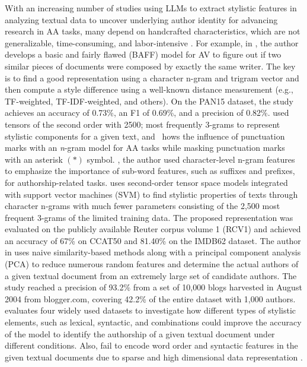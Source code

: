 \documentclass[conference]{IEEEtran}
\begin{document}
With an increasing number of studies using LLMs to extract stylistic features in analyzing textual data to uncover underlying author identity for advancing research in AA tasks, many depend on handcrafted characteristics, which are not generalizable, time-consuming, and labor-intensive \cite{ding2017learning,stamatatos2009survey,vosoughi2016tweet2vec}. For example, in \cite{bevendorff2019bias}, the author develops a basic and fairly flawed (BAFF) model for AV to figure out if two similar pieces of documents were composed by exactly the same writer. The key is to find a good representation using a character n-gram and trigram vector and then compute a style difference using a well-known distance measurement (e.g., TF-weighted, TF-IDF-weighted, and others). On the PAN15 dataset, the study achieves an accuracy of 0.73\%, an F1 of 0.69\%, and a precision of 0.82\%. \cite{plakias2008tensor} used tensors of the second order with 2500; most frequently 3-grams to represent stylistic components for a given text, and~\cite{muttenthaler2019authorship} hows the influence of punctuation marks with an \textit{n}-gram model for AA tasks while masking punctuation marks with an asterisk $(\ast)$ symbol. \cite{sapkota2015not}, the author used character-level n-gram features to emphasize the importance of sub-word features, such as suffixes and prefixes, for authorship-related tasks. \cite{plakias2008tensor} uses second-order tensor space models integrated with support vector machines (SVM) to find stylistic properties of texts through character n-grams with much fewer parameters consisting of the 2,500 most frequent 3-grams of the limited training data. The proposed representation was evaluated on the publicly available Reuter corpus volume 1 (RCV1) and achieved an accuracy of 67\% on CCAT50 and 81.40\% on the IMDB62 dataset. The author in \cite{koppel2011authorship} uses naive similarity-based methods along with a principal component analysis (PCA) to reduce numerous random features and determine the actual authors of a given textual document from an extremely large set of candidate authors. The study reached a precision of 93.2\% from a set of 10,000 blogs harvested in August 2004 from blogger.com, covering 42.2\% of the entire dataset with 1,000 authors. \cite{sari2018topic} evaluates four widely used datasets to investigate how different types of stylistic elements, such as lexical, syntactic, and combinations could improve the accuracy of the model to identify the authorship of a given textual document under different conditions. Also, fail to encode word order and syntactic features in the given textual documents due to sparse and high dimensional data representation \cite{liu2020character}. 
\end{document}
